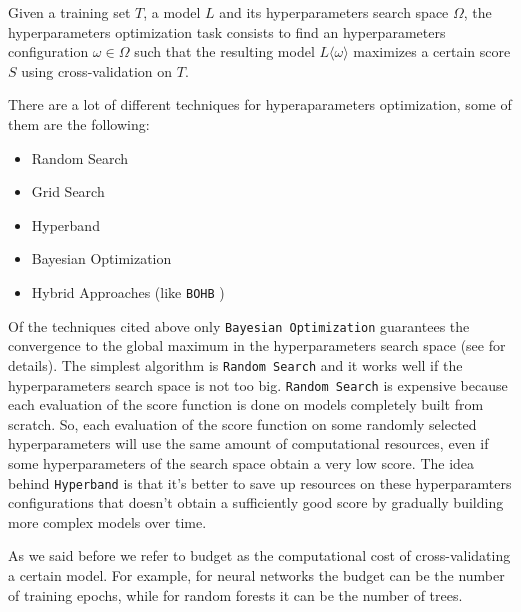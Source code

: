 \documentclass[11pt, a4paper]{article}
\begin{document}
  Given a training set $T$, a model $L$ and its hyperparameters search space $\Omega$, the hyperparameters optimization task consists to find an hyperparameters configuration $\omega \in \Omega$ such that the resulting model $L\langle\omega\rangle$ maximizes a certain score $S$ using cross-validation on $T$.

  There are a lot of different techniques for hyperaparameters optimization, some of them are the following:
  \begin{itemize}
    \item Random Search
    \item Grid Search
    \item Hyperband
    \item Bayesian Optimization
    \item Hybrid Approaches (like \texttt{BOHB} \cite{bohb})
  \end{itemize}

  Of the techniques cited above only \texttt{Bayesian Optimization} guarantees the convergence to the global maximum in the hyperparameters search space (see \cite{bayesianoptimization} for details). The simplest algorithm is \texttt{Random Search} and it works well if the hyperparameters search space is not too big. \texttt{Random Search} is expensive because each evaluation of the score function is done on models completely built from scratch. So, each evaluation of the score function on some randomly selected hyperparameters will use the same amount of computational resources, even if some hyperparameters of the search space obtain a very low score. The idea behind \texttt{Hyperband} is that it's better to save up resources on these hyperparamters configurations that doesn't obtain a sufficiently good score by gradually building more complex models over time.
  
  As we said before we refer to budget as the computational cost of cross-validating a certain model. For example, for neural networks the budget can be the number of training epochs, while for random forests it can be the number of trees.
\end{document}
